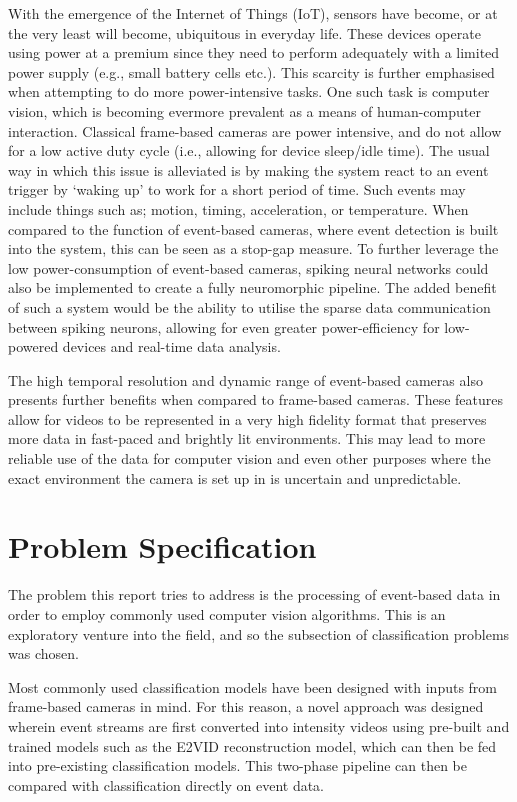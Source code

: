 With the emergence of the Internet of Things (IoT), sensors have become, or at the very least will become, ubiquitous in everyday life. These devices operate using power at a premium since they need to perform adequately with a limited power supply (e.g., small battery cells etc.). This scarcity is further emphasised when attempting to do more power-intensive tasks. One such task is computer vision, which is becoming evermore prevalent as a means of human-computer interaction. Classical frame-based cameras are power intensive, and do not allow for a low active duty cycle (i.e., allowing for device sleep/idle time). The usual way in which this issue is alleviated is by making the system react to an event trigger by `waking up' to work for a short period of time. Such events may include things such as; motion, timing, acceleration, or temperature. When compared to the function of event-based cameras, where event detection is built into the system, this can be seen as a stop-gap measure. To further leverage the low power-consumption of event-based cameras, spiking neural networks could also be implemented to create a fully neuromorphic pipeline. The added benefit of such a system would be the ability to utilise the sparse data communication between spiking neurons, allowing for even greater power-efficiency for low-powered devices and real-time data analysis.

The high temporal resolution and dynamic range of event-based cameras also presents further benefits when compared to frame-based cameras. These features allow for videos to be represented in a very high fidelity format that preserves more data in fast-paced and brightly lit environments. This may lead to more reliable use of the data for computer vision and even other purposes where the exact environment the camera is set up in is uncertain and unpredictable.

\section{Problem Specification}

The problem this report tries to address is the processing of event-based data in order to employ commonly used computer vision algorithms. This is an exploratory venture into the field, and so the subsection of classification problems was chosen. 

Most commonly used classification models have been designed with inputs from frame-based cameras in mind. For this reason, a novel approach was designed wherein event streams are first converted into intensity videos using pre-built and trained models such as the E2VID reconstruction model\cite{spikingToVideo}, which can then be fed into pre-existing classification models. This two-phase pipeline can then be compared with classification directly on event data.

